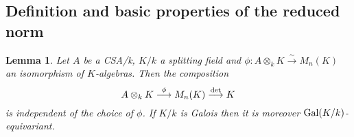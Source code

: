 \documentclass[11pt]{amsart}
\numberwithin{equation}{section}
\newtheorem{lemma}[equation]{Lemma}
\theoremstyle{remark}
\theoremstyle{remark}
\theoremstyle{remark}
\theoremstyle{definition}
\theoremstyle{definition}
\theoremstyle{definition}
\theoremstyle{definition}
\theoremstyle{definition}
\theoremstyle{definition}
\begin{document}
\subsection{Definition and basic properties of the reduced norm}

%

\begin{lemma} \label{galois invariance of det composition}
Let $A$ be a CSA/k, $K/k$ a splitting field and $\phi:A\otimes_kK\stackrel{\sim}{\longrightarrow}M_n(K)$ an isomorphism of $K$-algebras. Then the composition
\[A\otimes_kK \stackrel{\phi}{\longrightarrow} M_n(K)\stackrel{\textup{det}}{\longrightarrow}K\]
is  independent of the choice of $\phi$. If $K/k$ is  Galois then it is moreover $\textup{Gal}(K/k)$-equivariant.
\end{lemma}
\end{document}
